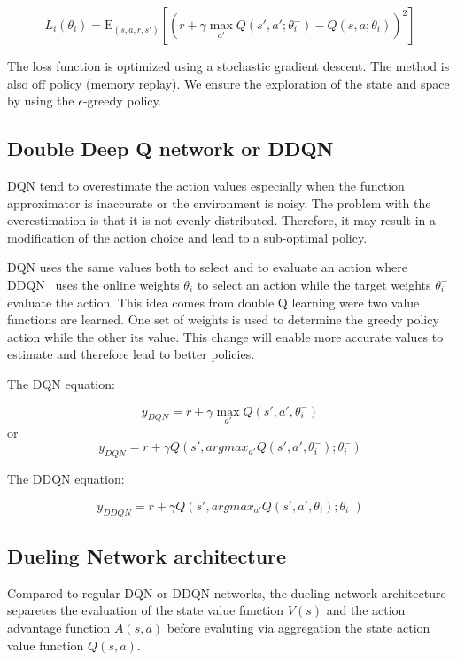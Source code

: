 \documentclass[12pt]{article}
\begin{document}
\begin{equation}  
L_{i}(\theta_{i}) =\mathrm{E}_{(s,a,r,s')}[(r+\gamma  \max_{a'} Q(s',a'; \theta_{i}^- )-Q(s,a;\theta_{i}))^2]
\end{equation} 

The loss function is optimized using a stochastic gradient descent.
The method is also off policy (memory replay). We ensure the exploration of the state and space by using the $\epsilon$-greedy policy.


\subsection*{Double Deep Q network or DDQN}
DQN tend to overestimate the action values especially when the function approximator is inaccurate or the environment is noisy. The problem with the overestimation is that it is not evenly distributed. Therefore, it may result in a modification of the action choice and lead to a sub-optimal policy.

DQN uses the same values both to select and to evaluate an action where DDQN~\cite{Hasselt2016} uses the online weights $\theta_i$ to select an action while the target weights $\theta_i^-$ evaluate the action. 
This idea comes from double Q learning were two value functions are learned.
One set of weights is used to determine the greedy policy action while the other its value.
This change will enable more accurate values to estimate and therefore lead to better policies.

The DQN equation:

\begin{equation}
	y_{DQN}=r+\gamma \max_{a'} Q(s',a',\theta_i^-)
\end{equation}
or 
\begin{equation}
	y_{DQN}=r+\gamma Q(s',argmax_{a'} Q(s',a',\theta_i^-);\theta_i^-)
\end{equation}

The DDQN equation:

\begin{equation}
	y_{DDQN}=r+\gamma Q(s',argmax_{a'} Q(s',a',\theta_i);\theta_i^-)
\end{equation}

\subsection*{Dueling Network architecture}
Compared to regular DQN or DDQN networks, the dueling network architecture~\cite{BellemareDM17} separetes the evaluation of the state value function $V(s)$ and the action advantage function $A(s,a)$ before evaluting via aggregation the state action value function $Q(s,a)$.
\end{document}
